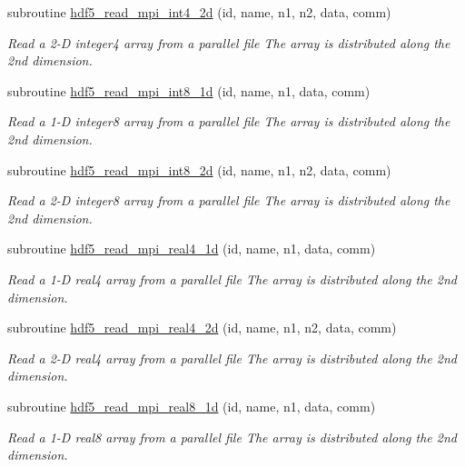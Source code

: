 \begin{DoxyCompactItemize}
subroutine \hyperlink{classmodhdf5_ac96ae5057bcd6745840c716a232d4b66}{hdf5\-\_\-read\-\_\-mpi\-\_\-int4\-\_\-2d} (id, name, n1, n2, data, comm)
\begin{DoxyCompactList}\small\item\em Read a 2-\/\-D integer4 array from a parallel file The array is distributed along the 2nd dimension. \end{DoxyCompactList}\item 
subroutine \hyperlink{classmodhdf5_a2847f70176f88d95e8e6e1bec3a2539e}{hdf5\-\_\-read\-\_\-mpi\-\_\-int8\-\_\-1d} (id, name, n1, data, comm)
\begin{DoxyCompactList}\small\item\em Read a 1-\/\-D integer8 array from a parallel file The array is distributed along the 2nd dimension. \end{DoxyCompactList}\item 
subroutine \hyperlink{classmodhdf5_a41bc63b78ce861c9898ef45642514a9d}{hdf5\-\_\-read\-\_\-mpi\-\_\-int8\-\_\-2d} (id, name, n1, n2, data, comm)
\begin{DoxyCompactList}\small\item\em Read a 2-\/\-D integer8 array from a parallel file The array is distributed along the 2nd dimension. \end{DoxyCompactList}\item 
subroutine \hyperlink{classmodhdf5_a7c2f69141e8a85768536e7c8f79f6348}{hdf5\-\_\-read\-\_\-mpi\-\_\-real4\-\_\-1d} (id, name, n1, data, comm)
\begin{DoxyCompactList}\small\item\em Read a 1-\/\-D real4 array from a parallel file The array is distributed along the 2nd dimension. \end{DoxyCompactList}\item 
subroutine \hyperlink{classmodhdf5_a406b07a6320d4dd08a12ca4b8d6b9e9d}{hdf5\-\_\-read\-\_\-mpi\-\_\-real4\-\_\-2d} (id, name, n1, n2, data, comm)
\begin{DoxyCompactList}\small\item\em Read a 2-\/\-D real4 array from a parallel file The array is distributed along the 2nd dimension. \end{DoxyCompactList}\item 
subroutine \hyperlink{classmodhdf5_afaf6a2a85551a1a7e9638d597c39dc32}{hdf5\-\_\-read\-\_\-mpi\-\_\-real8\-\_\-1d} (id, name, n1, data, comm)
\begin{DoxyCompactList}\small\item\em Read a 1-\/\-D real8 array from a parallel file The array is distributed along the 2nd dimension. \end{DoxyCompactList}\item 

\end{DoxyCompactItemize}
